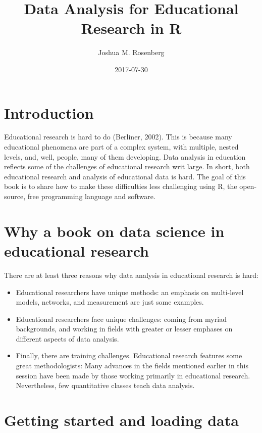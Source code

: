 \documentclass[]{book}
\title{Data Analysis for Educational Research in R}
\author{Joshua M. Rosenberg}
\date{2017-07-30}
\theoremstyle{definition}
\theoremstyle{definition}
\theoremstyle{remark}
\begin{document}
\maketitle

{
\setcounter{tocdepth}{1}
\tableofcontents
}
\chapter{Introduction}\label{introduction}

Educational research is hard to do (Berliner, 2002). This is because
many educational phenomena are part of a complex system, with multiple,
nested levels, and, well, people, many of them developing. Data analysis
in education reflects some of the challenges of educational research
writ large. In short, both educational research and analysis of
educational data is hard. The goal of this book is to share how to make
these difficulties less challenging using R, the open-source, free
programming language and software.

\chapter{Why a book on data science in educational
research}\label{why-a-book-on-data-science-in-educational-research}

There are at least three reasons why data analysis in educational
research is hard:

\begin{itemize}
\item
  Educational researchers have unique methods: an emphasis on
  multi-level models, networks, and measurement are just some examples.
\item
  Educational researchers face unique challenges: coming from myriad
  backgrounds, and working in fields with greater or lesser emphases on
  different aspects of data analysis.
\item
  Finally, there are training challenges. Educational research features
  some great methodologists: Many advances in the fields mentioned
  earlier in this session have been made by those working primarily in
  educational research. Nevertheless, few quantitative classes teach
  data analysis.
\end{itemize}

\chapter{Getting started and loading
data}\label{getting-started-and-loading-data}
\end{document}
